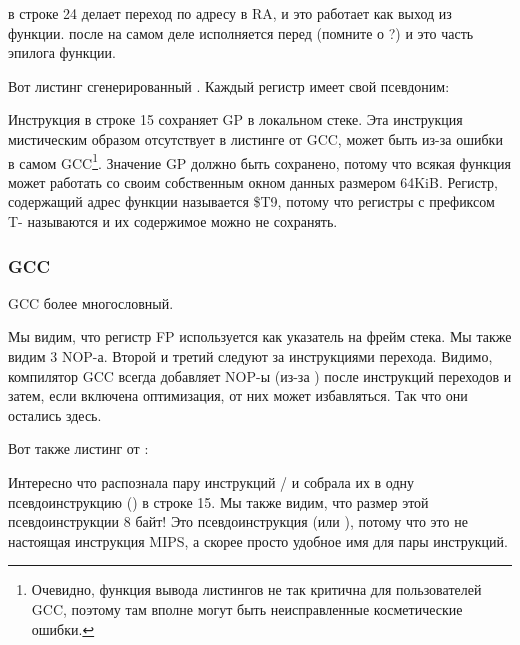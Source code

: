  в строке 24 делает переход по адресу в \ac{RA}, и это работает как выход из функции.
 после  на самом деле исполняется перед  (помните о ?) 
и это часть эпилога функции.

Вот листинг сгенерированный \IDA. Каждый регистр имеет свой псевдоним:



Инструкция в строке 15 сохраняет GP в локальном стеке. Эта инструкция мистическим образом отсутствует
в листинге от GCC, может быть из-за ошибки в самом GCC\footnote{Очевидно, функция вывода листингов не так критична
для пользователей GCC, поэтому там вполне могут быть неисправленные косметические ошибки.}.
Значение GP должно быть сохранено, потому что всякая функция может работать со своим собственным окном данных
размером 64KiB.
Регистр, содержащий адрес функции \puts называется \$T9, потому что регистры с префиксом T- называются
 и их содержимое можно не сохранять.

\subsubsection{\NonOptimizing GCC}

\NonOptimizing GCC более многословный.



Мы видим, что регистр FP используется как указатель на фрейм стека.
Мы также видим 3 \ac{NOP}-а.
Второй и третий следуют за инструкциями перехода.
Видимо, компилятор GCC всегда добавляет \ac{NOP}-ы (из-за )
после инструкций переходов и затем, если включена оптимизация, от них может избавляться.
Так что они остались здесь.

Вот также листинг от \IDA:



Интересно что \IDA распознала пару инструкций / и собрала их в одну псевдоинструкцию 
 () в строке 15.
Мы также видим, что размер этой псевдоинструкции 8 байт!
Это псевдоинструкция (или ), потому что это не настоящая инструкция MIPS, а скорее
просто удобное имя для пары инструкций.

